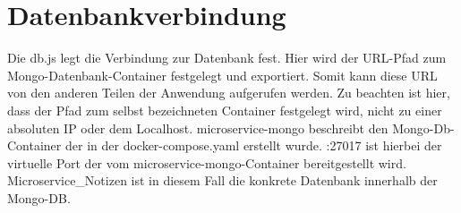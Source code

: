 
\chapter{Datenbankverbindung}
\label{ch:Datenbankverbindung}
Die db.js legt die Verbindung zur Datenbank fest. Hier wird der URL-Pfad zum Mongo-Datenbank-Container festgelegt und exportiert. Somit kann diese URL von den anderen Teilen der Anwendung aufgerufen werden.
Zu beachten ist hier, dass der Pfad zum selbst bezeichneten Container festgelegt wird, nicht zu einer absoluten IP oder dem Localhost. \glqq  microservice-mongo\grqq{} beschreibt den Mongo-Db-Container der in der docker-compose.yaml erstellt wurde. \glqq  :27017\grqq{} ist hierbei der virtuelle Port der vom microservice-mongo-Container bereitgestellt wird. \glqq  Microservice\_Notizen\grqq{} ist in diesem Fall die konkrete Datenbank innerhalb der Mongo-DB.